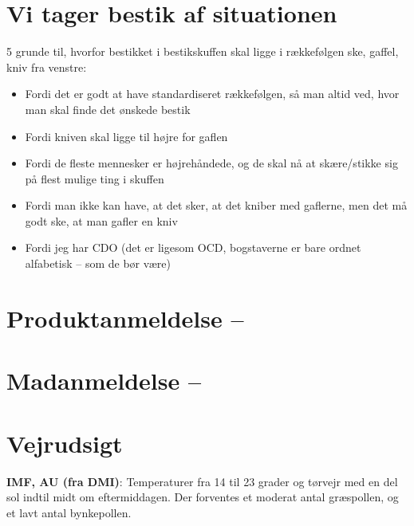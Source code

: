 

\begin{minipage}[b]{0.95\linewidth}
\begin{minipage}[t]{0.47\textwidth}
\vspace{3mm}
\section*{Vi tager bestik af situationen}

5 grunde til, hvorfor bestikket i bestikskuffen skal ligge i rækkefølgen ske, gaffel, kniv fra venstre:

\begin{itemize}
\item Fordi det er godt at have standardiseret rækkefølgen, så man altid ved, hvor man skal finde det ønskede bestik
\item Fordi kniven skal ligge til højre for gaflen
\item Fordi de fleste mennesker er højrehåndede, og de skal nå at skære/stikke sig på flest mulige ting i skuffen
\item Fordi man ikke kan have, at det sker, at det kniber med gaflerne, men det må godt ske, at man gafler en kniv
\item Fordi jeg har CDO (det er ligesom OCD, bogstaverne er bare ordnet alfabetisk – som de bør være)
\end{itemize}

\section*{Produktanmeldelse -- }


\vspace{1mm}
\section*{Madanmeldelse -- }


\end{minipage}%
\hfill\begin{minipage}[t]{0.47\textwidth}
\vspace{3mm}
\section*{Vejrudsigt}
\textbf{IMF, AU (fra DMI)}: Temperaturer fra 14 til 23 grader og tørvejr med en del sol indtil midt om eftermiddagen. Der forventes et moderat antal græspollen, og et lavt antal bynkepollen.


\end{minipage}
\end{minipage}
